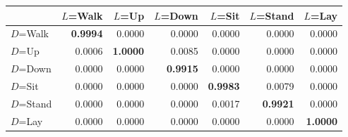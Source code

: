\begin{tabular}{lrrrrrr}
\toprule
 & $L$=Walk & $L$=Up & $L$=Down & $L$=Sit & $L$=Stand & $L$=Lay \\
\midrule
$D$=Walk & \textbf{0.9994} & 0.0000 & 0.0000 & 0.0000 & 0.0000 & 0.0000 \\
$D$=Up & 0.0006 & \textbf{1.0000} & 0.0085 & 0.0000 & 0.0000 & 0.0000 \\
$D$=Down & 0.0000 & 0.0000 & \textbf{0.9915} & 0.0000 & 0.0000 & 0.0000 \\
$D$=Sit & 0.0000 & 0.0000 & 0.0000 & \textbf{0.9983} & 0.0079 & 0.0000 \\
$D$=Stand & 0.0000 & 0.0000 & 0.0000 & 0.0017 & \textbf{0.9921} & 0.0000 \\
$D$=Lay & 0.0000 & 0.0000 & 0.0000 & 0.0000 & 0.0000 & \textbf{1.0000} \\
\bottomrule
\end{tabular}
